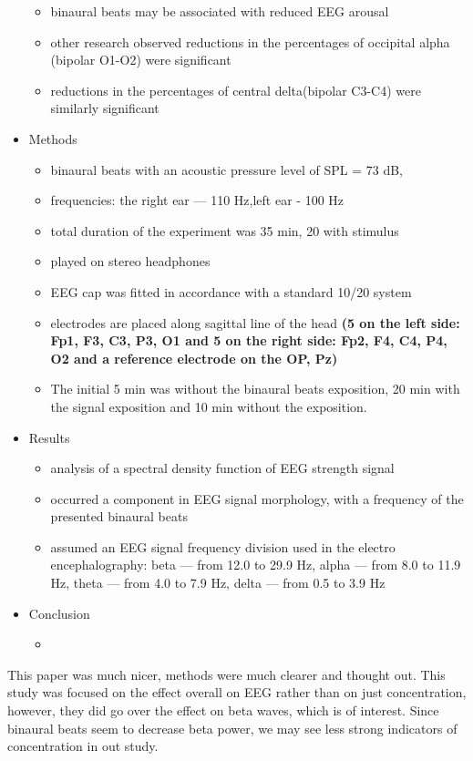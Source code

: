 \documentclass[a4paper]{article}
\begin{document}
\begin{itemize}
\begin{itemize}
              \item binaural beats may be associated with
                    reduced EEG arousal
              \item other research observed reductions in the percentages of occipital alpha (bipolar O1-O2) were signiﬁcant
              \item reductions in the percentages of central delta(bipolar C3-C4) were similarly signiﬁcant
          \end{itemize}
    \item Methods
          \begin{itemize}
              \item binaural beats with an acoustic pressure level of SPL = 73 dB,
              \item frequencies: the right ear — 110 Hz,left ear - 100 Hz
              \item total duration of the experiment was 35 min, 20 with stimulus
              \item played on stereo headphones
              \item EEG cap was fitted in accordance with a standard 10/20 system
              \item electrodes are placed along sagittal line of the head \textbf{(5 on the left side: Fp1, F3, C3, P3, O1 and 5 on the right side: Fp2, F4, C4, P4, O2 and a reference electrode on the OP, Pz)}
              \item The initial 5 min was without the binaural beats exposition, 20 min with the signal exposition and 10 min without the exposition.
          \end{itemize}
    \item Results
          \begin{itemize}
              \item analysis of a spectral density function of EEG strength signal
              \item occurred a component in EEG signal morphology, with a frequency of the presented binaural beats
              \item assumed an EEG signal frequency division used in the electro encephalography: beta — from 12.0 to 29.9 Hz, alpha — from 8.0 to 11.9 Hz, theta — from 4.0 to 7.9 Hz, delta — from 0.5 to 3.9 Hz
          \end{itemize}
    \item Conclusion
          \begin{itemize}
              \item
          \end{itemize}
\end{itemize}

This paper was much nicer, methods were much clearer and thought out. This study was focused on the effect overall on EEG rather than on just concentration, however, they did go over the effect on beta waves, which is of interest. Since binaural beats seem to decrease beta power, we may see less strong indicators of concentration in out study.
\end{document}
